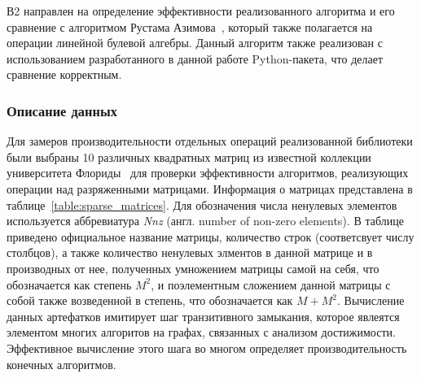 В2 направлен на определение эффективности реализованного алгоритма и его сравнение с алгоритмом Рустама Азимова~\cite{inproceedings:cfqp_matrix_with_single_source}, который также полагается на операции линейной булевой алгебры. Данный алгоритм также реализован с использованием разработанного в данной работе Python-пакета, что делает сравнение корректным.

\subsubsection*{Описание данных}

Для замеров производительности отдельных операций реализованной библиотеки были выбраны 10 различных квадратных матриц из известной коллекции университета Флориды~\cite{net:sp_matrix_data_florida} для проверки эффективности алгоритмов, реализующих операции над разряженными матрицами. 
Информация о матрицах представлена в таблице~\ref{table:sparse_matrices}. Для обозначения числа ненулевых элементов используется аббревиатура \textit{Nnz} (англ. number of non-zero elements). В таблице приведено официальное название матрицы, количество строк (соответсвует числу столбцов), а также количество ненулевых элментов в данной матрице и в производных от нее, полученных умножением матрицы самой на себя, что обозначается как степень $M^2$, и поэлементным сложением данной матрицы с собой также возведенной в степень, что обозначается как $M + M^2$.
Вычисление данных артефатков имитирует шаг транзитивного замыкания, которое явлеятся элементом многих алгоритов на графах, связанных с анализом достижимости. Эффективное вычисление этого шага во многом определяет производительность конечных алгоритмов.

